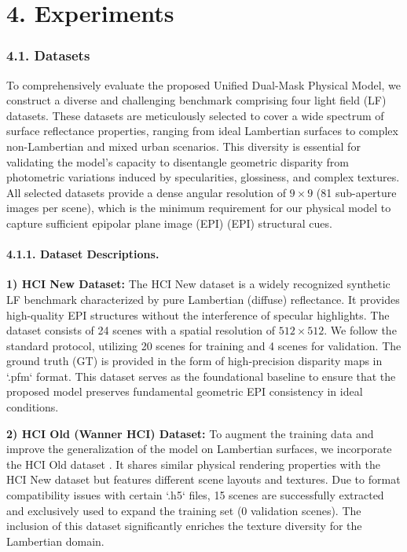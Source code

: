 \documentclass[lettersize,journal]{IEEEtran}
\begin{document}
\section{4. Experiments}

\subsubsection{4.1. Datasets}

To comprehensively evaluate the proposed Unified Dual-Mask Physical Model, we construct a diverse and challenging benchmark comprising four light field (LF) datasets. These datasets are meticulously selected to cover a wide spectrum of surface reflectance properties, ranging from ideal Lambertian surfaces to complex non-Lambertian and mixed urban scenarios. This diversity is essential for validating the model's capacity to disentangle geometric disparity from photometric variations induced by specularities, glossiness, and complex textures. All selected datasets provide a dense angular resolution of $9 \times 9$ (81 sub-aperture images per scene), which is the minimum requirement for our physical model to capture sufficient epipolar plane image (EPI) (EPI) structural cues.

\paragraph{4.1.1. Dataset Descriptions.}

\textbf{1) HCI New Dataset:} 
The HCI New dataset \cite{lightlight} is a widely recognized synthetic LF benchmark characterized by pure Lambertian (diffuse) reflectance. It provides high-quality EPI structures without the interference of specular highlights. The dataset consists of 24 scenes with a spatial resolution of $512 \times 512$. We follow the standard protocol, utilizing 20 scenes for training and 4 scenes for validation. The ground truth (GT) is provided in the form of high-precision disparity maps in `.pfm` format. This dataset serves as the foundational baseline to ensure that the proposed model preserves fundamental geometric EPI consistency in ideal conditions.

\textbf{2) HCI Old (Wanner HCI) Dataset:} 
To augment the training data and improve the generalization of the model on Lambertian surfaces, we incorporate the HCI Old dataset \cite{depthdepth}. It shares similar physical rendering properties with the HCI New dataset but features different scene layouts and textures. Due to format compatibility issues with certain `.h5` files, 15 scenes are successfully extracted and exclusively used to expand the training set (0 validation scenes). The inclusion of this dataset significantly enriches the texture diversity for the Lambertian domain.
\end{document}
